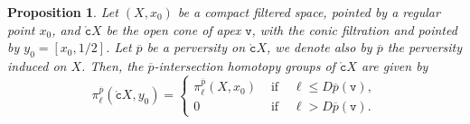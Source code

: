 \documentclass[a4paper,10pt,english,reqno]{amsart}
\theoremstyle{plain}
\newtheorem{proposition}{Proposition}[section]
\theoremstyle{definition}
\theoremstyle{remark}
\numberwithin{equation}{section}
\def\ov{\overline}
\def\tc{{\mathtt c}}
\def\tv{{\mathtt v}}
\def\rc{{\mathring{\tc}}}
\renewcommand\1{\hbox{\ding{192}}}
\renewcommand\2{\hbox{\ding{193}}}
\newcommand\3{\hbox{\ding{194}}}
\newcommand\4{\hbox{\ding{195}}}
\begin{document}
\begin{proposition}{\cite[Example 2]{MR1404919}}\label{prop:coneandhomotopy}
Let $(X,x_{0})$ be a compact filtered space,  pointed by a regular point $x_{0}$,
 and $\rc X$ be the open cone of apex $\tv$, with the conic filtration and pointed by $y_{0}=[x_{0},1/2]$.
Let $\ov{p}$ be a   perversity on $\rc X$,  
we denote also by $\ov{p}$ the perversity induced on $X$.
%
Then, the $\ov{p}$-intersection homotopy groups of $\rc X$ are given by 
$$
\pi_{\ell}^{\ov{p}}(\rc X,y_{0})=\left\{
\begin{array}{lcl}
\pi_{\ell}^{\ov{p}}(X,x_{0})&\text{ if }& \ell\leq D\ov{p}(\tv),\\ 
0&\text{ if }& \ell> D\ov{p}(\tv). 
\end{array}
\right.$$
\end{proposition}
\end{document}
